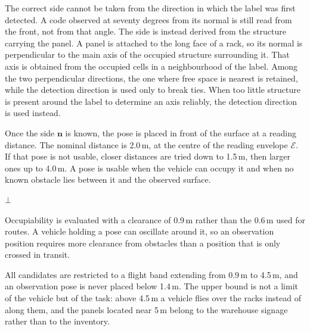 The correct side cannot be taken from the direction in which the label was first
detected. A code observed at seventy degrees from its normal is still read from
the front, not from that angle. The side is instead derived from the structure
carrying the panel. A panel is attached to the long face of a rack, so its normal
is perpendicular to the main axis of the occupied structure surrounding it. That
axis is obtained from the occupied cells in a neighbourhood of the label. Among
the two perpendicular directions, the one where free space is nearest is
retained, while the detection direction is used only to break ties. When too
little structure is present around the label to determine an axis reliably, the
detection direction is used instead.

Once the side $\mathbf{n}$ is known, the pose is placed in front of the surface at
a reading distance. The nominal distance is 2.0\,m, at the centre of the reading
envelope $\mathcal{E}$. If that pose is not usable, closer distances are tried
down to 1.5\,m, then larger ones up to 4.0\,m. A pose is usable when the vehicle
can occupy it and when no known obstacle lies between it and the observed
surface.

\begin{algorithm}[!htb]
    \caption{ObservationPose}%
    \label{algo:sys:obspose}
    \KwRet$\bot$\;
\end{algorithm}

\FloatBarrier

Occupiability is evaluated with a clearance of 0.9\,m rather than the 0.6\,m used
for routes. A vehicle holding a pose can oscillate around it, so an observation
position requires more clearance from obstacles than a position that is only
crossed in transit.

All candidates are restricted to a flight band extending from 0.9\,m to 4.5\,m,
and an observation pose is never placed below 1.4\,m. The upper bound is not a
limit of the vehicle but of the task: above 4.5\,m a vehicle flies over the racks
instead of along them, and the panels located near 5\,m belong to the warehouse
signage rather than to the inventory.

